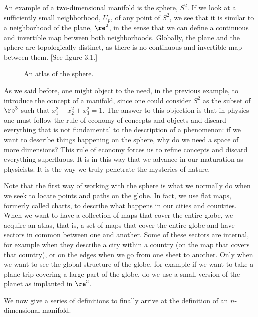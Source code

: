 An example of a two-dimensional manifold is the sphere, $S^2$.
If we look at a sufficiently small neighborhood, $U_p$, of any point of $S^2$, we see that it is similar to a neighborhood of the plane, $\re^2$, in the sense that we can define a continuous and invertible map between both neighborhoods. Globally, the plane and the sphere are topologically distinct, as there is no continuous and invertible map between them.
[See figure 3.1.]
\begin{figure}[htbp]
  \begin{center}
    \caption{An atlas of the sphere.}
    \label{fig:3_1}
  \end{center}
\end{figure}

As we said before, one might object to the need, in the previous example, to introduce the concept of a manifold, since one could consider $S^2$ as the subset of $\re^3$ such that $x_1^2+x_2^2+x_3^2=1$. The answer to this objection is that in physics one must follow the rule of economy of concepts and objects and discard everything that is not fundamental to the description of a phenomenon: if we want to describe things happening on the sphere, why do we need a space of more dimensions?
This rule of economy forces us to refine concepts and discard everything superfluous.
It is in this way that we advance in our maturation as physicists. It is the way we truly penetrate the mysteries of nature.

Note that the first way of working with the sphere is what we normally do when we seek to locate points and paths on the globe.
In fact, we use flat maps, formerly called charts, to describe what happens in our cities and countries.
When we want to have a collection of maps that cover the entire globe, we acquire an atlas, that is, a set of maps that cover the entire globe and have sectors in common between one and another. Some of these sectors are internal, for example when they describe a city within a country (on the map that covers that country), or on the edges when we go from one sheet to another.
Only when we want to see the global structure of the globe, for example if we want to take a plane trip covering a large part of the globe, do we use a small version of the planet as implanted in $\re^3$.

\noi We now give a series of definitions to finally arrive at the definition of an $n$-dimensional manifold.

